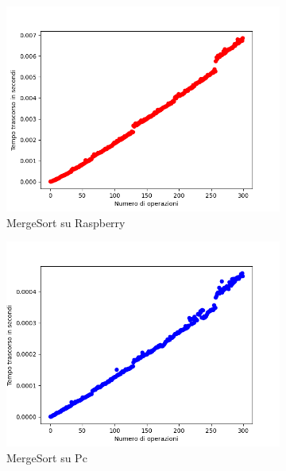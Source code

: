 \documentclass{article}
\begin{document}
			\begin{figure}[h!]
				\centering
				
				\begin{subfigure}{0.6\textwidth}
					\centering
					\includegraphics[width = \textwidth]{./Plots/Raspberry_MergeSort.png}
					\caption{MergeSort su Raspberry}
				\end{subfigure}
				\begin{subfigure}{0.6\textwidth}
					\centering
					\includegraphics[width = \textwidth]{./Plots/Pc_MergeSort.png}
					\caption{MergeSort su Pc}
				\end{subfigure}
				\begin{subfigure}{0.6\textwidth}
					\centering

\end{subfigure}
\end{figure}
\end{document}
